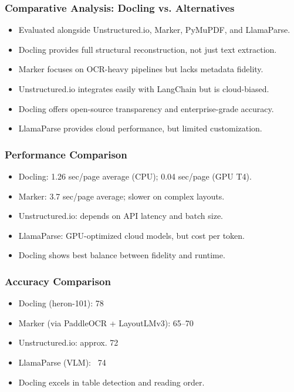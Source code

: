\begin{frame}[fragile]\frametitle{Comparative Analysis: Docling vs. Alternatives}
      \begin{itemize}
        \item Evaluated alongside Unstructured.io, Marker, PyMuPDF, and LlamaParse.
        \item Docling provides full structural reconstruction, not just text extraction.
        \item Marker focuses on OCR-heavy pipelines but lacks metadata fidelity.
        \item Unstructured.io integrates easily with LangChain but is cloud-biased.
        \item Docling offers open-source transparency and enterprise-grade accuracy.
        \item LlamaParse provides cloud performance, but limited customization.
      \end{itemize}
\end{frame}

\begin{frame}[fragile]\frametitle{Performance Comparison}
      \begin{itemize}
        \item Docling: 1.26 sec/page average (CPU); 0.04 sec/page (GPU T4).
        \item Marker: 3.7 sec/page average; slower on complex layouts.
        \item Unstructured.io: depends on API latency and batch size.
        \item LlamaParse: GPU-optimized cloud models, but cost per token.
        \item Docling shows best balance between fidelity and runtime.
      \end{itemize}
\end{frame}

\begin{frame}[fragile]\frametitle{Accuracy Comparison}
      \begin{itemize}
        \item Docling (heron-101): 78%
        \item Marker (via PaddleOCR + LayoutLMv3): 65–70%
        \item Unstructured.io: approx. 72%
        \item LlamaParse (VLM): ~74%
        \item Docling excels in table detection and reading order.
      \end{itemize}
\end{frame}

